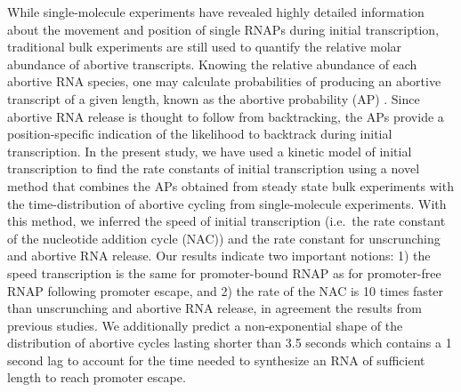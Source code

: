 While single-molecule experiments have revealed highly detailed information
about the movement and position of single RNAPs during initial transcription,
traditional bulk experiments are still used to quantify the relative molar
abundance of abortive transcripts. Knowing the relative abundance of each
abortive RNA species, one may calculate probabilities of producing an
abortive transcript of a given length, known as the abortive probability
(AP) \cite{hsu_promoter_2002, hsu_quantitative_1996}. Since abortive RNA
release is thought to follow from backtracking, the APs provide a
position-specific indication of the likelihood to backtrack during initial
transcription. In the present study, we have used a kinetic model of
initial transcription to find the rate constants of initial transcription
using a novel method that combines the APs obtained from steady state bulk
experiments with the time-distribution of abortive cycling from
single-molecule experiments. With this method, we inferred the speed of
initial transcription (i.e.\ the rate constant of the nucleotide addition
cycle (NAC)) and the rate constant for unscrunching and abortive RNA release.
Our results indicate two important notions: 1) the speed transcription is the
same for promoter-bound RNAP as for promoter-free RNAP following promoter
escape, and 2) the rate of the NAC is 10 times faster than unscrunching and
abortive RNA release, in agreement the results from previous studies. We
additionally predict a non-exponential shape of the distribution of abortive
cycles lasting shorter than 3.5 seconds which contains a 1 second lag to
account for the time needed to synthesize an RNA of sufficient length to reach
promoter escape.
